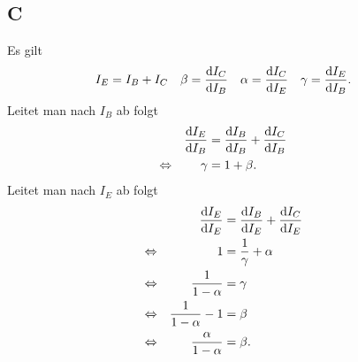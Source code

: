 \documentclass[10pt]{article}
\begin{document}
\begin{multicols}{2}
	\subsection{C}
	Es gilt
	\begin{align}
		I_E & =I_B+I_C & \beta & =\diff[]{I_C}{I_B} & \alpha & =\diff[]{I_C}{I_E} & \gamma & =\diff[]{I_E}{I_B}
		.\end{align}
	Leitet man nach $I_B$ ab folgt
	\begin{align}
		                &  & \diff[]{I_E}{I_B} & =\diff[]{I_B}{I_B}+\diff[]{I_C}{I_B} &  & \\
		\Leftrightarrow &  & \gamma            & =1+\beta .                           &  &
	\end{align}
	Leitet man nach $I_E$ ab folgt
	\begin{align}
		                &  & \diff[]{I_E}{I_E}          & =\diff[]{I_B}{I_E}+\diff[]{I_C}{I_E} &  &           \\
		\Leftrightarrow &  & 1                          & =\dfrac{1}{\gamma }+\alpha           &  & \nonumber \\
		\Leftrightarrow &  & \dfrac{1}{1-\alpha }       & =\gamma                              &  & \nonumber \\
		\Leftrightarrow &  & \dfrac{1}{1-\alpha }-1     & =\beta                               &  & \nonumber \\
		\Leftrightarrow &  & \dfrac{\alpha }{1-\alpha } & =\beta .                             &  &
	\end{align}


\end{multicols}
\end{document}
